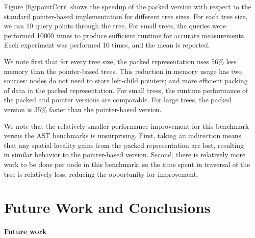 \documentclass[a4paper,english]{lipics-v2016}
\begin{document}
  
Figure \ref{fig:pointCorr} shows the speedup of the packed version with respect to the standard pointer-based implementation for different tree sizes. For each tree size, we ran 10 query points through the tree. For small trees, the queries were performed 10000 times to produce sufficient runtime for accurate measurements. Each experiment was performed 10 times, and the mean is reported. 

We note first that for every tree size, the packed representation uses 56\% less memory than the pointer-based trees. This reduction in memory usage has two sources: nodes do not need to store left-child pointers; and more efficient packing of data in the packed representation. For small trees, the runtime performance of the packed and pointer versions are comparable. For large trees, the packed version is 35\% faster than the pointer-based version.

We note that the relatively smaller performance improvement for this benchmark versus the AST benchmarks is unsurprising. First, taking an indirection means that any spatial locality gains from the packed representation are lost, resulting in similar behavior to the pointer-based version. Second, there is relatively more work to be done per node in this benchmark, so the time spent in traversal of the tree is relatively less, reducing the opportunity for improvement.
% 








\section{Future Work and Conclusions}
\label{sec:future}
\label{sec:conclusion}
\paragraph*{Future work}
\end{document}
